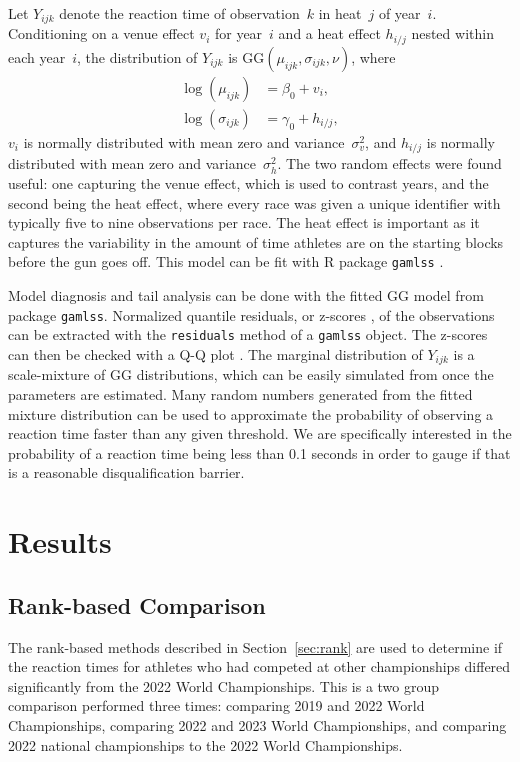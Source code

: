 \documentclass[12pt, letterpaper]{article}
\begin{document}
Let $Y_{ijk}$ denote the reaction time of observation~$k$ in heat~$j$
of year~$i$. Conditioning on a venue effect $v_i$ for year~$i$ 
and a heat effect $h_{i/j}$ nested within each year~$i$, the
distribution of $Y_{ijk}$ is
$\text{GG}(\mu_{ijk}, \sigma_{ijk}, \nu)$, where
\begin{align}
\log(\mu_{ijk}) &= \beta_0 + v_i ,\\
\log(\sigma_{ijk}) &= \gamma_0 + h_{i/j},
\end{align}
$v_i$ is normally distributed with mean zero and
variance~$\sigma_v^2$, and $h_{i/j}$ is normally distributed with mean
zero and variance~$\sigma_h^2$.
The two random effects were found useful: one capturing the venue effect, which
is used to contrast years, and the second being the heat effect, where every
race was given a unique identifier with typically five to nine observations
per race. The heat effect is important as it captures the variability in the
amount of time athletes are on the starting blocks before the gun goes off.
This model can be fit with R package \texttt{gamlss}
\citep{stasinopoulos2024generalized}.


Model diagnosis and tail analysis can be done with the fitted GG model
from package \texttt{gamlss}. Normalized quantile residuals, or
z-scores \citep{dunn1996randomized}, of the observations can be
extracted with the \texttt{residuals} method of a \texttt{gamlss}
object. The z-scores can then be checked with a Q-Q plot
\citep{almeida2018ggplot2}. The marginal
distribution of $Y_{ijk}$ is a scale-mixture of GG distributions, which can be
easily simulated from once the parameters are estimated. Many
random numbers generated from the fitted mixture distribution can be used to
approximate the probability of observing a reaction time faster than any given
threshold. We are specifically interested in the probability of a reaction time
being less than 0.1 seconds in order to gauge if that is a reasonable 
disqualification barrier.



\section{Results} \label{sec:Results}

\subsection{Rank-based Comparison} \label{subsec:Results_Rank}

The rank-based methods described in Section~\ref{sec:rank} are used
to determine if the reaction times for athletes who had competed at other 
championships differed significantly from the 2022 World Championships. This is
a two group comparison performed three times: comparing 2019 and 2022 World
Championships, comparing 2022 and 2023 World Championships, and comparing 2022 
national championships to the 2022 World Championships.
\end{document}
